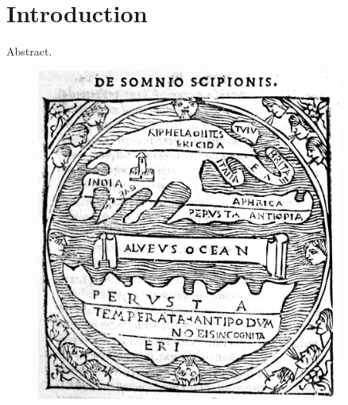 \chapter{Introduction}
\label{c.intro}

Abstract.

\begin{figure}
\includegraphics[width=0.9\textwidth]{intro/figures/macrobius.jpg}
\caption{}
\label{fig:macrobius}
\end{figure}
